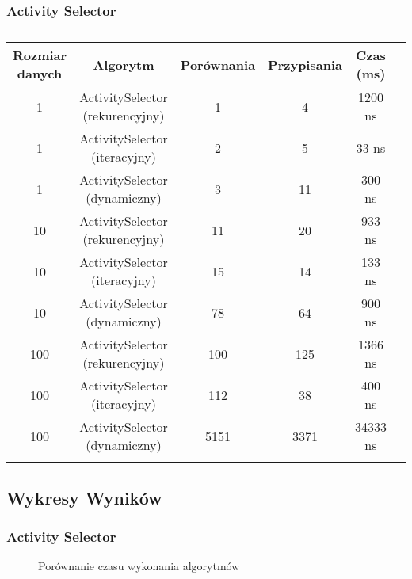 \documentclass[a4paper,12pt]{article}
\begin{document}
\subsubsection{Activity Selector}
\begin{longtable}{|c|c|c|c|c|c|}
\hline
Rozmiar danych & Algorytm & Porównania & Przypisania & Czas (ms) \\
\hline
1 & ActivitySelector (rekurencyjny) & 1 & 4 & 1200 ns \\
1 & ActivitySelector (iteracyjny) & 2 & 5 & 33 ns \\
1 & ActivitySelector (dynamiczny) & 3 & 11 & 300 ns \\
\hline
10 & ActivitySelector (rekurencyjny) & 11 & 20 & 933 ns \\
10 & ActivitySelector (iteracyjny) & 15 & 14 & 133 ns \\
10 & ActivitySelector (dynamiczny) & 78 & 64 & 900 ns \\
\hline
100 & ActivitySelector (rekurencyjny) & 100 & 125 & 1366 ns \\
100 & ActivitySelector (iteracyjny) & 112 & 38 & 400 ns \\
100 & ActivitySelector (dynamiczny) & 5151 & 3371 & 34333 ns \\
\hline
\caption{}
\label{tab:results}
\end{longtable}

\subsection{Wykresy Wyników}
\subsubsection{Activity Selector}
\begin{figure}[H]
    \centering
    \caption{Porównanie czasu wykonania algorytmów}
    \label{fig:execution_time}
\end{figure}
\end{document}
